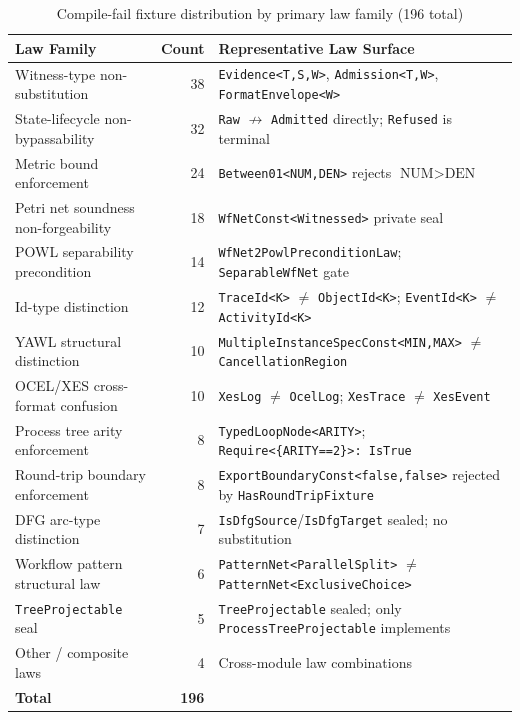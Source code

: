 \begin{table}[ht]
\centering
\caption{Compile-fail fixture distribution by primary law family (196 total)}
\label{tab:law-families}
\begin{tabular}{@{}lrl@{}}
\toprule
Law Family & Count & Representative Law Surface \\
\midrule
Witness-type non-substitution      & 38 & \texttt{Evidence<T,S,W>}, \texttt{Admission<T,W>}, \texttt{FormatEnvelope<W>} \\
State-lifecycle non-bypassability  & 32 & \texttt{Raw} $\not\to$ \texttt{Admitted} directly; \texttt{Refused} is terminal \\
Metric bound enforcement           & 24 & \texttt{Between01<NUM,DEN>} rejects $\text{NUM} > \text{DEN}$ \\
Petri net soundness non-forgeability & 18 & \texttt{WfNetConst<Witnessed>} private seal \\
POWL separability precondition     & 14 & \texttt{WfNet2PowlPreconditionLaw}; \texttt{SeparableWfNet} gate \\
Id-type distinction                & 12 & \texttt{TraceId<K>} $\neq$ \texttt{ObjectId<K>}; \texttt{EventId<K>} $\neq$ \texttt{ActivityId<K>} \\
YAWL structural distinction        & 10 & \texttt{MultipleInstanceSpecConst<MIN,MAX>} $\neq$ \texttt{CancellationRegion} \\
OCEL/XES cross-format confusion    & 10 & \texttt{XesLog} $\neq$ \texttt{OcelLog}; \texttt{XesTrace} $\neq$ \texttt{XesEvent} \\
Process tree arity enforcement     & 8  & \texttt{TypedLoopNode<ARITY>}; \texttt{Require<\{ARITY==2\}>: IsTrue} \\
Round-trip boundary enforcement    & 8  & \texttt{ExportBoundaryConst<false,false>} rejected by \texttt{HasRoundTripFixture} \\
DFG arc-type distinction           & 7  & \texttt{IsDfgSource}/\texttt{IsDfgTarget} sealed; no substitution \\
Workflow pattern structural law    & 6  & \texttt{PatternNet<ParallelSplit>} $\neq$ \texttt{PatternNet<ExclusiveChoice>} \\
\texttt{TreeProjectable} seal      & 5  & \texttt{TreeProjectable} sealed; only \texttt{ProcessTreeProjectable} implements \\
Other / composite laws             & 4  & Cross-module law combinations \\
\midrule
\textbf{Total}                     & \textbf{196} & \\
\bottomrule
\end{tabular}
\end{table}

